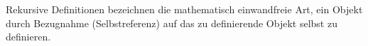 


Rekursive Definitionen bezeichnen die mathematisch einwandfreie Art, ein Objekt durch Bezugnahme (Selbstreferenz) auf das zu definierende Objekt selbst zu definieren.

